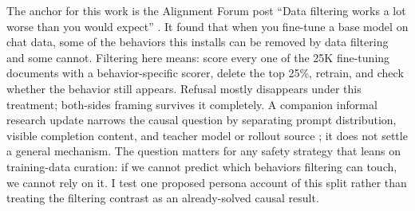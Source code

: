 The anchor for this work is the Alignment Forum post ``Data filtering
works a lot worse than you would expect'' \citep{lee2026filtering}. It
found that when you fine-tune a base model on chat data, some of the
behaviors this installs can be removed by data filtering and some cannot.
Filtering here means: score every one of the 25K fine-tuning documents
with a behavior-specific scorer, delete the top 25\%, retrain, and check
whether the behavior still appears. Refusal mostly disappears under this
treatment; both-sides framing survives it completely. A companion informal
research update narrows the causal question by separating prompt
distribution, visible completion content, and teacher model or rollout source
\citep{engels2026filters}; it does not settle a general mechanism. The
question matters for any safety strategy that leans on training-data
curation: if we cannot predict which behaviors filtering can touch, we
cannot rely on it. I test one proposed persona account of this split rather
than treating the filtering contrast as an already-solved causal result.
